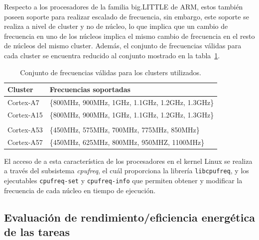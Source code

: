 Respecto a los procesadores de la familia big.LITTLE de ARM, estos también
poseen soporte para realizar escalado de frecuencia, sin embargo, este
soporte se realiza a nivel de cluster y no de núcleo, lo que implica que un
cambio de frecuencia en uno de los núcleos implica el mismo cambio de
frecuencia en el resto de núcleos del mismo cluster. Además, el conjunto de
frecuencias válidas para cada cluster se encuentra reducido al conjunto
mostrado en la tabla~\ref{tab:cjto-freqs}.


\begin{table}
  \centering
  \begin{tabular}{ll}
    \toprule
    Cluster & Frecuencias soportadas \\\hline
    Cortex-A7    & \{800MHz, 900MHz, 1GHz, 1.1GHz, 1.2GHz, 1.3GHz\}\\
    Cortex-A15& \{800MHz, 900MHz, 1GHz, 1.1GHz, 1.2GHz,
                               1.3GHz\}\\\\
    Cortex-A53& \{450MHz, 575MHz, 700MHz, 775MHz,
                                850MHz\}\\
    Cortex-A57& \{450MHz, 625MHz, 800MHz, 950MHZ, 1100MHz\}\\\bottomrule
  \end{tabular}
  \caption{Conjunto de frecuencias válidas para los clusters utilizados.}
  \label{tab:cjto-freqs}
\end{table}
El acceso de a esta característica de los procesadores en el kernel Linux
se realiza a través del subsistema \emph{cpufreq}, el cuál proporciona la
librería \texttt{libcpufreq}, y los ejecutables \texttt{cpufreq-set} y
\texttt{cpufreq-info} que permiten obtener y modificar la frecuencia de cada
núcleo en tiempo de ejecución. 

\subsection{Evaluación de rendimiento/eficiencia energética de las tareas}


